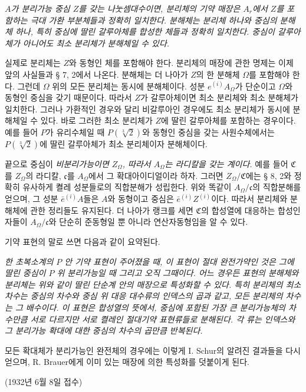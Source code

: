 \emph{\(A\)가 분리가능 중심 \(Z\)를 갖는 나눗셈대수이면, 분리체의 기약 매장은 \(A_r\)에서 \(Z\)를 포함하는 극대 가환 부분체들과 정확히 일치한다. 분해체는 분리체 하나와 중심의 분해체 하나, 특히 중심에 딸린 갈루아체를 합성한 체들과 정확히 일치한다. 중심이 갈루아체가 아니어도 최소 분리체가 분해체일 수 있다.}

실제로 분리체는 \(Z\)와 동형인 체를 포함해야 한다. 분리체의 매장에 관한 명제는 이제 앞의 사실들과 § 7, 2에서 나온다. 분해체는 더 나아가 \(Z\)의 한 분해체 \(\Omega\)를 포함해야 한다. 그런데 \(\Omega\) 위의 모든 분리체는 동시에 분해체이다. 성분 \(e^{(i)}A_\Omega\)가 단순이고 \(\Omega\)와 동형인 중심을 갖기 때문이다. 따라서 \(Z\)가 갈루아체이면 최소 분리체와 최소 분해체가 일치한다. 그러나 가환적인 경우와 달리 비갈루아인 경우에도 최소 분리체가 동시에 분해체일 수 있다. 바로 그러한 최소 분리체가 \(Z\)에 딸린 갈루아체를 포함하는 경우이다. 예를 들어 \(P\)가 유리수체일 때 \(P(\sqrt[3]{2})\)와 동형인 중심을 갖는 사원수체에서는 \(P(\sqrt[3]{2})\)에 딸린 갈루아체가 최소 분리체이자 분해체이다.

끝으로 중심이 \emph{비분리가능이면 \(Z_\Omega\), 따라서 \(A_\Omega\)는 라디칼을 갖는 계이다.} 예를 들어 \(\mathfrak C\)를 \(Z_\Omega\)의 라디칼, \(\mathfrak c\)를 \(A_\Omega\)에서 그 확대아이디얼이라 하자. 그러면 \(Z_\Omega/\mathfrak C\)에는 § 8, 2와 정확히 유사하게 켤레 성분들로의 직합분해가 성립한다. 위와 똑같이 \(A_\Omega/\mathfrak c\)의 직합분해를 얻으며, 그 성분 \(\bar e^{(i)}A\)들은 \(A\)와 동형이고 중심은 \(\bar e^{(i)}Z^{(i)}\)이다. 따라서 분리체와 분해체에 관한 정리들도 유지된다. 더 나아가 랭크를 세면 \(\mathfrak C\)의 합성열에 대응하는 합성인자들이 \(A_\Omega/\mathfrak c\)와 단순히 준동형일 뿐 아니라 연산자동형임을 알 수 있다.

기약 표현의 말로 쓰면 다음과 같이 요약된다.

\noindent\textbf{} \emph{한 초복소계의 \(P\) 안 기약 표현이 주어졌을 때, 이 표현이 절대 완전가약인 것은 그에 딸린 중심이 \(P\) 위 분리가능일 때 그리고 오직 그때이다. 어느 경우든 표현의 분해체와 분리체는 위와 같이 딸린 단순계 안의 매장으로 특성화할 수 있다. 특히 분리체의 최소차수는 중심의 차수와 중심 위 대응 대수류의 인덱스의 곱과 같고, 모든 분리체의 차수는 그 배수이다. 이 표현은 합성열의 뜻에서, 중심에 포함된 가장 큰 분리가능체의 차수만큼 서로 다르지만 서로 켤레인 절대기약 표현류들로 분해된다. 각 류는 인덱스와 그 분리가능 확대에 대한 중심의 차수의 곱만큼 반복된다.}

모든 확대체가 분리가능인 완전체의 경우에는 이렇게 I. Schur의 알려진 결과들을 다시 얻으며, R. Brauer에게 이미 있는 매장에 의한 특성화를 덧붙이게 된다.

\begin{center}
(1932년 6월 8일 접수)
\end{center}
